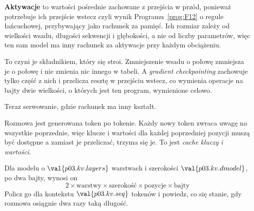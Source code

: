 \begin{fr}

\textbf{Aktywacje} to wartości pośrednie zachowane z przejścia w przód,
ponieważ potrzebuje ich przejście wstecz \dash{} czyli wynik
Programu~\ref{prog:F12} o regule łańcuchowej, przybywający jako rachunek za
pamięć. Ich rozmiar zależy od wielkości wsadu, długości sekwencji i głębokości,
a nie od liczby parametrów, więc ten sam model ma inny rachunek za aktywacje
przy każdym obciążeniu.

To czyni je składnikiem, który się stroi. Zmniejszenie wsadu o połowę zmniejsza
je o połowę i nie zmienia nic innego w tabeli. A \emph{gradient checkpointing}
zachowuje tylko część z nich i przelicza resztę w przejściu wstecz, co wymienia
operacje na bajty \dash{} dwie wielkości, o których jest ten program, wymienione
celowo.
\end{fr}

\begin{fr}
Teraz serwowanie, gdzie rachunek ma inny kształt.

Rozmowa jest generowana token po tokenie. Każdy nowy token zwraca uwagę na
wszystkie poprzednie, więc klucze i wartości dla każdej poprzedniej pozycji
muszą być dostępne \dash{} a zamiast je przeliczać, trzyma się je. To jest
\emph{cache kluczy i wartości}.

Dla modelu o $\val{p03.kv.layers}$ warstwach i szerokości
$\val{p03.kv.dmodel}$, po dwa bajty, wynosi on
\[ 2 \times \text{warstwy} \times \text{szerokość} \times \text{pozycje}
   \times \text{bajty} \]
Policz go dla kontekstu $\val{p03.kv.seq}$ tokenów i powiedz, co się stanie,
gdy rozmowa osiągnie dwa razy taką długość.
\nextframe
\end{fr}

